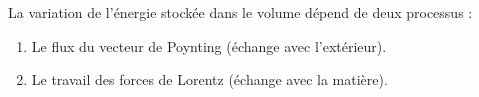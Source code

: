 \documentclass[french]{yLectureNote}
\renewcommand{\vec}{\overrightarrow}
\begin{document}
La variation de l'énergie stockée dans le volume dépend de deux processus :
\begin{enumerate}
    \item Le flux du vecteur de Poynting (échange avec l'extérieur).
    \item Le travail des forces de Lorentz (échange avec la matière).
\end{enumerate}







\end{document}

